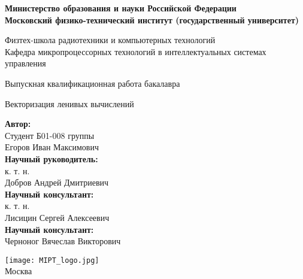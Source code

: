 \begin{center}
    \large\textbf{Министерство образования и науки Российской Федерации \\
    Московский физико-технический институт (государственный
    университет)} \\
    \vspace{1cm}

    Физтех-школа радиотехники и компьютерных технологий \\

    Кафедра микропроцессорных технологий в интеллектуальных системах управления \\

    \vspace{3em}

    Выпускная квалификационная работа бакалавра
\end{center}

\begin{center}
    \vspace{\fill}
    \LARGE{Векторизация ленивых вычислений}

    \vspace{\fill}
\end{center}


\begin{flushright}
    \textbf{Автор:} \\
    Студент Б01-008 группы \\
    Егоров Иван Максимович \\
    \vspace{2em}
    \textbf{Научный руководитель:} \\
    к. т. н. \\
    Добров Андрей Дмитриевич \\
    \vspace{2em}
    \textbf{Научный консультант:} \\
    к. т. н. \\
    Лисицин Сергей Алексеевич \\
    \vspace{2em}
    \textbf{Научный консультант:} \\
    Черноног Вячеслав Викторович \\
\end{flushright}

\vspace{7em}

\begin{center}
    \texttt{[image: MIPT\_logo.jpg]}\\
    Москва \the\year{}
\end{center}

\thispagestyle{empty}

\newpage
\setcounter{page}{2}
\fancyfoot[c]{\thepage}
\fancyhead[R]{}